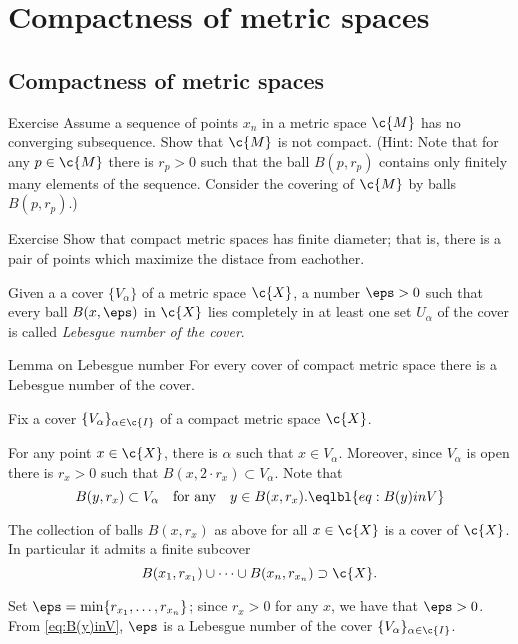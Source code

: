 \chapter{Compactness of metric spaces}

\section{Compactness of metric spaces}

\begin{thm}{Exercise}
Assume a sequence of points $x_n$ in a metric space $\c{M}$ has no converging subsequence.
Show that $\c{M}$ is not compact.
(Hint: Note that for any $p\in \c{M}$ there is $r_p>0$ such that the ball $B(p,r_p)$ contains only finitely many elements of the sequence. Consider the covering of $\c{M}$ by balls $B(p,r_p)$.)
\end{thm}


\begin{thm}{Exercise}
Show that compact metric spaces has finite diameter;
that is, there is a pair of points which maximize the distace from eachother.
\end{thm}

Given a a cover $\{V_\alpha\}$ of a metric space $\c{X}$, a number $\eps > 0$ such that every ball $B(x,\eps)$ in $\c{X}$ lies completely in at least one set $U_\alpha$ of the cover is called \emph{Lebesgue number of the cover}.

\begin{thm}{Lemma on Lebesgue number}
For every cover of compact metric space there is a  Lebesgue number of the cover.
\end{thm}

Fix a cover $\{V_\alpha\}_{\alpha\in\c{I}}$ of a compact metric space $\c{X}$.

For any point $x\in \c{X}$, there is $\alpha$ such that $x\in V_\alpha$.
Moreover, since $V_\alpha$ is open there is $r_x>0$ such that 
$B(x,2\cdot r_x)\subset V_\alpha$.
Note that 
\[B(y,r_x)\subset V_\alpha\quad\text{for any}\quad y\in B(x,r_x).
\eqlbl{eq:B(y)inV}\] 

The collection of balls $B(x,r_x)$ as above for all $x\in\c{X}$
is a cover of $\c{X}$.
In particular it admits a finite subcover
\[B(x_1,r_{x_1})\cup\dots\cup B(x_n,r_{x_n})\supset \c{X}.\]

Set $\eps=\min\{r_{x_1},\dots,r_{x_n}\}$;
since $r_x>0$ for any $x$, we have that $\eps>0$.
From \ref{eq:B(y)inV}, $\eps$ is a Lebesgue number of the cover $\{V_\alpha\}_{\alpha\in\c{I}}$.
\qeds

